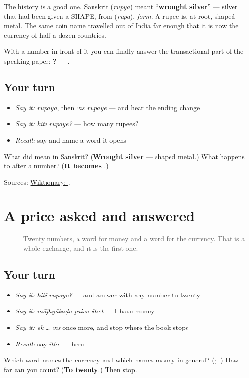 The history is a good one. Sanskrit \textbf{} (\emph{rūpya}) meant \textquotedblleft{}\textbf{wrought silver}\textquotedblright{} — silver that had been given a SHAPE, from \textbf{} (\emph{rūpa}), \emph{form}. A rupee is, at root, shaped metal. The same coin name travelled out of India far enough that it is now the currency of half a dozen countries.

With a number in front of it you can finally answer the transactional part of the speaking paper: \textbf{?} — \textbf{ }.

\subsection*{Your turn}
\begin{itemize}
\raggedright
  \item \emph{Say it:} \emph{rupayā}, then \emph{vīs rupaye} — and hear the ending change
  \item \emph{Say it:} \emph{kitī rupaye?} — how many rupees?
  \item \emph{Recall:} say \textbf{} and name a word it opens
\end{itemize}

\begin{tcolorbox}[breakable,colback=teal!4,colframe=teal!35!black,title={Before you move on}]
What did \textbf{} mean in Sanskrit? (\textbf{Wrought silver} — shaped metal.) What happens to \textbf{} after a number? (\textbf{It becomes }.)

Sources: \href{https://en.wiktionary.org/wiki/\%E0\%A4\%B0\%E0\%A5\%81\%E0\%A4\%AA\%E0\%A4\%AF\%E0\%A4\%BE}{Wiktionary: }.
\end{tcolorbox}
\section[\texorpdfstring{\mr{किती} \mr{रुपये}? (kitī rupaye?)}{किती रुपये? (kitī rupaye?)}]{A price asked and answered}

\label{lesson:MR-R59-what-it-costs}



\begin{quote}
Twenty numbers, a word for money and a word for the currency. That is a whole exchange, and it is the first one.
\end{quote}

\subsection*{Your turn}
\begin{itemize}
\raggedright
  \item \emph{Say it:} \emph{kitī rupaye?} — and answer with any number to twenty
  \item \emph{Say it:} \emph{mājhyākaḍe paise āhet} — I have money
  \item \emph{Say it:} \emph{ek} … \emph{vīs} once more, and stop where the book stops
  \item \emph{Recall:} say \emph{ithe} — here
\end{itemize}

\begin{tcolorbox}[breakable,colback=teal!4,colframe=teal!35!black,title={Before you move on}]
Which word names the currency and which names money in general? (\textbf{}; \textbf{}.) How far can you count? (\textbf{To twenty}.) Then stop.
\end{tcolorbox}
